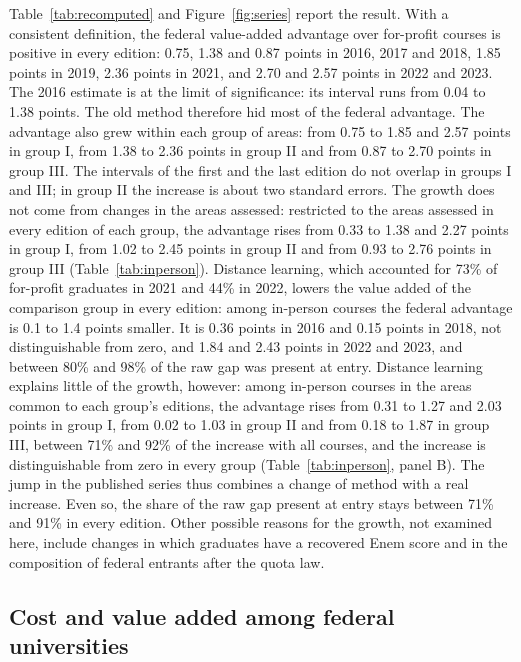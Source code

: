 \documentclass[11pt,a4paper]{article}
\begin{document}
Table~\ref{tab:recomputed} and Figure~\ref{fig:series} report the result. With a consistent definition, the federal value-added advantage over for-profit courses is positive in every edition: 0.75, 1.38 and 0.87 points in 2016, 2017 and 2018, 1.85 points in 2019, 2.36 points in 2021, and 2.70 and 2.57 points in 2022 and 2023. The 2016 estimate is at the limit of significance: its interval runs from 0.04 to 1.38 points. The old method therefore hid most of the federal advantage. The advantage also grew within each group of areas: from 0.75 to 1.85 and 2.57 points in group I, from 1.38 to 2.36 points in group II and from 0.87 to 2.70 points in group III. The intervals of the first and the last edition do not overlap in groups I and III; in group II the increase is about two standard errors. The growth does not come from changes in the areas assessed: restricted to the areas assessed in every edition of each group, the advantage rises from 0.33 to 1.38 and 2.27 points in group I, from 1.02 to 2.45 points in group II and from 0.93 to 2.76 points in group III (Table~\ref{tab:inperson}). Distance learning, which accounted for 73\% of for-profit graduates in 2021 and 44\% in 2022, lowers the value added of the comparison group in every edition: among in-person courses the federal advantage is 0.1 to 1.4 points smaller. It is 0.36 points in 2016 and 0.15 points in 2018, not distinguishable from zero, and 1.84 and 2.43 points in 2022 and 2023, and between 80\% and 98\% of the raw gap was present at entry. Distance learning explains little of the growth, however: among in-person courses in the areas common to each group's editions, the advantage rises from 0.31 to 1.27 and 2.03 points in group I, from 0.02 to 1.03 in group II and from 0.18 to 1.87 in group III, between 71\% and 92\% of the increase with all courses, and the increase is distinguishable from zero in every group (Table~\ref{tab:inperson}, panel B). The jump in the published series thus combines a change of method with a real increase. Even so, the share of the raw gap present at entry stays between 71\% and 91\% in every edition. Other possible reasons for the growth, not examined here, include changes in which graduates have a recovered Enem score and in the composition of federal entrants after the quota law.

\subsection{Cost and value added among federal universities}
\end{document}
